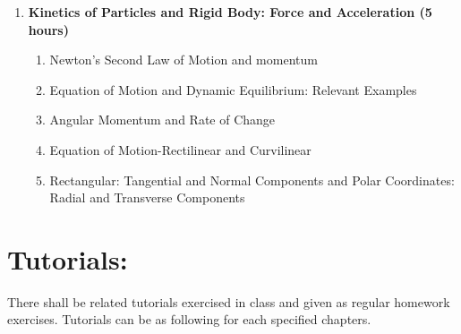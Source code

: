 \begin{enumerate}
    \item \textbf{Kinetics of Particles and Rigid Body: Force and Acceleration \hfill (5 hours)}
    \begin{enumerate}
        \item Newton's Second Law of Motion and momentum
        \item Equation of Motion and Dynamic Equilibrium: Relevant Examples
        \item Angular Momentum and Rate of Change
        \item Equation of Motion-Rectilinear and Curvilinear
        \item Rectangular: Tangential and Normal Components and Polar Coordinates: Radial and Transverse Components
    \end{enumerate}
\end{enumerate}


\section*{Tutorials:}
There shall be related tutorials exercised in class and given as regular homework exercises. Tutorials can be as following for each specified chapters.

